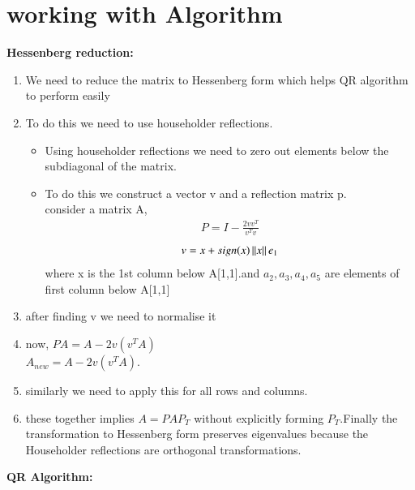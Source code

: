 \documentclass[journal]{IEEEtran}
\begin{document}
    
\section{\textbf{working with Algorithm}}

      \textbf{Hessenberg reduction:}\\
      \begin{enumerate}
      \item We need to reduce the matrix to Hessenberg form which helps QR algorithm to perform easily
      \item To do this we need to use householder reflections.
      \begin{itemize}
      \item Using householder reflections we need to zero out elements below the subdiagonal of the matrix.
      \item To do this we construct a vector v and a reflection matrix p.\\
      consider a matrix A,
      \begin{align*}
      P = I - \frac{2vv^T}{v^Tv}
      \end{align*}
      \begin{align*}
      v = x + sign(x)\left\lVert x\right\rVert e_1
      \end{align*} 
      where x is the 1st column below A[1,1].and $a_2,a_3,a_4,a_5$ are elements of first column below A[1,1]
      
      \end{itemize}
      \item after finding v we need to normalise it 
      \item now, $PA = A - 2v(v^TA)$\\
      $A_{new} = A - 2v(v^TA)$.
      \item similarly we need to apply this for all rows and columns.
      \item these together implies $A = PAP_T$ without explicitly forming $P_T$.Finally the transformation to Hessenberg form preserves 
      eigenvalues because the Householder reflections are orthogonal transformations.
      \end{enumerate}  
      \textbf{QR Algorithm:}\\
\end{document}
